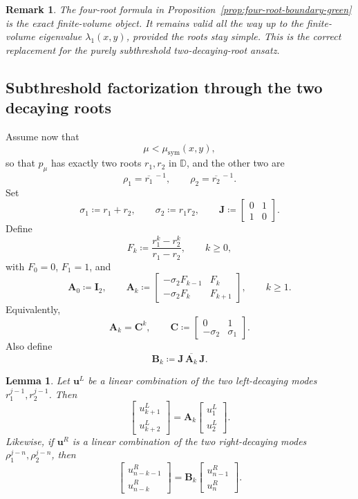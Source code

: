 \documentclass[11pt]{article}
\newtheorem{lemma}[theorem]{Lemma}
\newtheorem{remark}[theorem]{Remark}
\begin{document}
\begin{remark}
The four-root formula in Proposition~\ref{prop:four-root-boundary-green} is the exact finite-volume object. It remains valid all the way up to the finite-volume eigenvalue \(\lambda_1(x,y)\), provided the roots stay simple. This is the correct replacement for the purely subthreshold two-decaying-root ansatz.
\end{remark}

\subsection*{Subthreshold factorization through the two decaying roots}

Assume now that
\[
\mu<\mu_{\mathrm{sym}}(x,y),
\]
so that \(p_\mu\) has exactly two roots \(r_1,r_2\) in \(\mathbb D\), and the other two are
\[
\rho_1=\overline{r_1}^{\,-1},
\qquad
\rho_2=\overline{r_2}^{\,-1}.
\]
Set
\[
\sigma_1\coloneqq r_1+r_2,
\qquad
\sigma_2\coloneqq r_1r_2,
\qquad
\mathbf J\coloneqq
\begin{bmatrix}
0&1\\
1&0
\end{bmatrix}.
\]
Define
\[
F_k\coloneqq \frac{r_1^k-r_2^k}{r_1-r_2},
\qquad k\ge 0,
\]
with \(F_0=0\), \(F_1=1\), and
\[
\mathbf A_0\coloneqq \mathbf I_2,
\qquad
\mathbf A_k\coloneqq
\begin{bmatrix}
-\sigma_2 F_{k-1} & F_k\\
-\sigma_2 F_k & F_{k+1}
\end{bmatrix},
\qquad k\ge 1.
\]
Equivalently,
\[
\mathbf A_k=\mathbf C^k,
\qquad
\mathbf C\coloneqq
\begin{bmatrix}
0&1\\
-\sigma_2&\sigma_1
\end{bmatrix}.
\]
Also define
\[
\mathbf B_k\coloneqq \mathbf J\,\overline{\mathbf A_k}\,\mathbf J.
\]

\begin{lemma}\label{lem:block-propagators}
Let \(\mathbf u^L\) be a linear combination of the two left-decaying modes \(r_1^{j-1},r_2^{j-1}\). Then
\[
\begin{bmatrix}
u_{k+1}^L\\
u_{k+2}^L
\end{bmatrix}
=
\mathbf A_k
\begin{bmatrix}
u_1^L\\
u_2^L
\end{bmatrix}.
\]
Likewise, if \(\mathbf u^R\) is a linear combination of the two right-decaying modes
\(\rho_1^{j-n},\rho_2^{j-n}\), then
\[
\begin{bmatrix}
u_{n-k-1}^R\\
u_{n-k}^R
\end{bmatrix}
=
\mathbf B_k
\begin{bmatrix}
u_{n-1}^R\\
u_n^R
\end{bmatrix}.
\]
\end{lemma}
\end{document}
